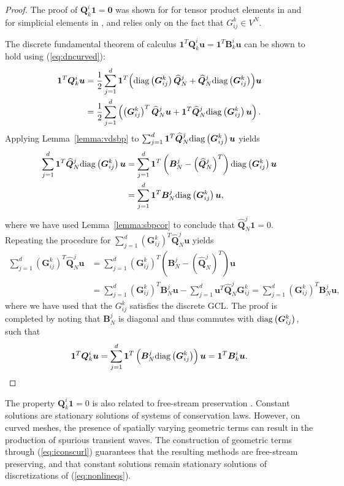 \documentclass{svjour3}                     %
\renewcommand{\hat}{\widehat}
\newcommand{\diag}[1]{{\rm diag}\LRp{#1}}
\newcommand{\LRp}[1]{\left( #1 \right)}
\begin{document}
\begin{proof}
The proof of $\bm{Q}^i_k\bm{1} = \bm{0}$ was shown for for tensor product elements in \cite{kopriva2006metric} and for simplicial elements in \cite{chan2018discretely}, and relies only on the fact that $G^k_{ij} \in V^N$.  

The discrete fundamental theorem of calculus $\bm{1}^T\bm{Q}^i_k\bm{u} = \bm{1}^T\bm{B}^i_k\bm{u}$ can be shown to hold using (\ref{eq:dncurved}):
\begin{align*}
\bm{1}^T\bm{Q}^i_k\bm{u} &= \frac{1}{2}\sum_{j=1}^d \bm{1}^T{\LRp{\diag{\bm{G}^k_{ij}}\hat{\bm{Q}}^j_N + \hat{\bm{Q}}^j_N\diag{\bm{G}^k_{ij}}}} \bm{u} \\
&= \frac{1}{2}\sum_{j=1}^d \LRp{\LRp{\bm{G}^k_{ij}}^T \hat{\bm{Q}}^j_N\bm{u} + \bm{1}^T\hat{\bm{Q}}^j_N\diag{\bm{G}^k_{ij}}\bm{u}}.
\end{align*}
Applying Lemma~\ref{lemma:vdsbp} to $\sum_{j=1}^d\bm{1}^T\hat{\bm{Q}}^j_N\diag{\bm{G}^k_{ij}}\bm{u}$ yields
\begin{align*}
\sum_{j=1}^d\bm{1}^T\hat{\bm{Q}}^j_N\diag{\bm{G}^k_{ij}}\bm{u} &= \sum_{j=1}^d\bm{1}^T\LRp{\bm{B}^j_N - \LRp{\hat{\bm{Q}}^j_N}^T}\diag{\bm{G}^k_{ij}}\bm{u} \\
&= \sum_{j=1}^d\bm{1}^T\bm{B}^j_N \diag{\bm{G}^k_{ij}}\bm{u},
\end{align*}
where we have used Lemma~\ref{lemma:sbpcor} to conclude that $\hat{\bm{Q}}^j_N \bm{1} = 0$.
Repeating the procedure for $\sum_{j=1}^d \LRp{\bm{G}^k_{ij}}^T \hat{\bm{Q}}^j_N\bm{u}$ yields
\begin{align*}
\sum_{j=1}^d \LRp{\bm{G}^k_{ij}}^T \hat{\bm{Q}}^j_N\bm{u} &= \sum_{j=1}^d \LRp{\bm{G}^k_{ij}}^T \LRp{\bm{B}^j_N - \LRp{\hat{\bm{Q}}^j_N}^T}\bm{u} \\
&= \sum_{j=1}^d \LRp{\bm{G}^k_{ij}}^T \bm{B}^j_N \bm{u} - \sum_{j=1}^d \bm{u}^T{\hat{\bm{Q}}^j_N}{\bm{G}^k_{ij}} = \sum_{j=1}^d \LRp{\bm{G}^k_{ij}}^T \bm{B}^j_N \bm{u},  
\end{align*}
where we have used that the $G^k_{ij}$ satisfies the discrete GCL.  The proof is completed by noting that $\bm{B}^j_N$ is diagonal and thus commutes with $\diag{\bm{G}^k_{ij}}$, such that
\[
\bm{1}^T\bm{Q}^i_k\bm{u} = \sum_{j=1}^d\bm{1}^T\LRp{\bm{B}^j_N \diag{\bm{G}^k_{ij}}}\bm{u} = \bm{1}^T\bm{B}^i_k \bm{u}.
\]
\end{proof}

The property $\bm{Q}^i_k\bm{1} = 0$ is also related to free-stream preservation \cite{kopriva2006metric}.  Constant solutions are stationary solutions of systems of conservation laws.  However, on curved meshes, the presence of spatially varying geometric terms can result in the production of spurious transient waves.  The construction of geometric terms through (\ref{eq:iconscurl}) guarantees that the resulting methods are free-stream preserving, and that constant solutions remain stationary solutions of discretizations of (\ref{eq:nonlineqs}).
\end{document}
